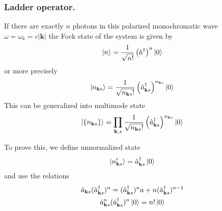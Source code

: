 \documentclass[../../../main.tex]{subfiles}
\begin{document}
\subsubsection{Ladder operator.}
If there are exactly $n$ photons in this polarized monochromatic wave $\omega=\omega_k=c|\mathbf{k}|$ the Fock state of the system is given by
\begin{equation*}
  \ket{n }= \frac{1 }{\sqrt{n !}}\left( \hat{a }^\dagger \right) ^n \ket{0}
\end{equation*}
or more precisely
\begin{equation*}
  \ket{n_{\mathbf{k }s} }= \frac{1 }{\sqrt{n_{\mathbf{k }s}!}}\left( \hat{a }^\dagger_{\mathbf{k }s} \right) ^{n_{\mathbf{k }s}} \ket{0}
\end{equation*}
This can be generalized into  multimode state
\begin{equation*}
  \ket{\left\{ n_{\mathbf{k }s}  \right\} }
  =\prod_{\mathbf{k },s} \frac{1 }{\sqrt{n_{\mathbf{k }s}!}}\left( \hat{a }^\dagger_{\mathbf{k }s} \right) ^{n_{\mathbf{k }s}} \ket{0}
\end{equation*}

To prove this, we define unnormalized state
\begin{equation*}
  \ket{n'_{\mathbf{k }s}}=\hat{a}^\dagger_{\mathbf{k }s} \ket{0}
\end{equation*}
and use the relations
\begin{gather*}
  \hat{a}_{\mathbf{k }s} (\hat{a}^\dagger_{\mathbf{k }s} )^n
  = (\hat{a}^\dagger_{\mathbf{k }s} )^n a +n (\hat{a}^\dagger_{\mathbf{k }s} )^{n-1} \\
  \hat{a}_{\mathbf{k }s} ^n(\hat{a}^\dagger_{\mathbf{k }s}) ^n \ket{0}= n! \ket{0}
\end{gather*}
\end{document}
